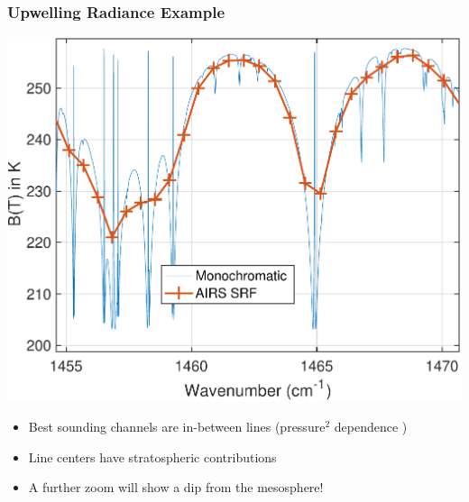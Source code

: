 \documentclass[10pt,t]{beamer}
\begin{document}
\begin{frame}
  \frametitle{Upwelling Radiance Example}
\vspace{-0.05in}
  \centering \includegraphics[width=0.75\linewidth]{Figslls/mono1460.pdf}
\vspace{-0.05in}
\begin{small}
\begin{itemize}
  \item Best sounding channels are in-between lines (pressure$^2$ dependence \vspace{-0.03in})
  \item Line centers have stratospheric contributions \vspace{-0.03in}
  \item A further zoom will show a dip from the mesosphere!
  \end{itemize}
\end{small}
\end{frame}
\end{document}
